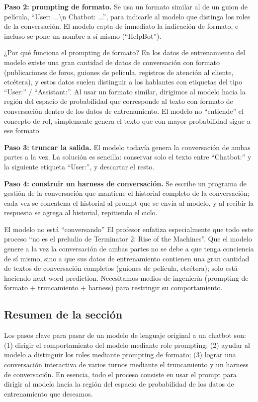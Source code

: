 \textbf{Paso 2: prompting de formato.} Se usa un formato similar al de un guion de película, ``User: ...\textbackslash n Chatbot: ...'', para indicarle al modelo que distinga los roles de la conversación. El modelo capta de inmediato la indicación de formato, e incluso se pone un nombre a sí mismo (``HelpBot'').

\begin{knowledgebox}{¿Por qué funciona el prompting de formato?}
En los datos de entrenamiento del modelo existe una gran cantidad de datos de conversación con formato (publicaciones de foros, guiones de película, registros de atención al cliente, etcétera), y estos datos suelen distinguir a los hablantes con etiquetas del tipo ``User:'' / ``Assistant:''. Al usar un formato similar, dirigimos al modelo hacia la región del espacio de probabilidad que corresponde al texto con formato de conversación dentro de los datos de entrenamiento. El modelo no ``entiende'' el concepto de rol, simplemente genera el texto que con mayor probabilidad sigue a ese formato.
\end{knowledgebox}

\textbf{Paso 3: truncar la salida.} El modelo todavía genera la conversación de ambas partes a la vez. La solución es sencilla: conservar solo el texto entre ``Chatbot:'' y la siguiente etiqueta ``User:'', y descartar el resto.

\textbf{Paso 4: construir un harness de conversación.} Se escribe un programa de gestión de la conversación que mantiene el historial completo de la conversación; cada vez se concatena el historial al prompt que se envía al modelo, y al recibir la respuesta se agrega al historial, repitiendo el ciclo.

\begin{warningbox}{El modelo no está ``conversando''}
El profesor enfatiza especialmente que todo este proceso ``no es el preludio de Terminator 2: Rise of the Machines''. Que el modelo genere a la vez la conversación de ambas partes no se debe a que tenga conciencia de sí mismo, sino a que sus datos de entrenamiento contienen una gran cantidad de textos de conversación completos (guiones de película, etcétera); solo está haciendo next-word prediction. Necesitamos medios de ingeniería (prompting de formato + truncamiento + harness) para restringir su comportamiento.
\end{warningbox}

\subsection{Resumen de la sección}

Los pasos clave para pasar de un modelo de lenguaje original a un chatbot son: (1) dirigir el comportamiento del modelo mediante role prompting; (2) ayudar al modelo a distinguir los roles mediante prompting de formato; (3) lograr una conversación interactiva de varios turnos mediante el truncamiento y un harness de conversación. En esencia, todo el proceso consiste en usar el prompt para dirigir al modelo hacia la región del espacio de probabilidad de los datos de entrenamiento que deseamos.
